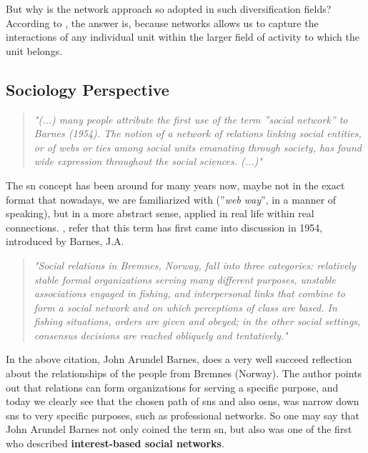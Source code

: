 \indent But why is the network approach so adopted in such diversification fields? According to \cite{kilduff2003social}, the answer is, because networks allows us to capture the interactions of any individual unit within the larger field of activity to which the unit belongs.


\subsection{Sociology Perspective}
\begin{quote}
\textit{"(...) many people attribute the first use of the term ''social network'' to
Barnes (1954). The notion of a network of relations linking social entities, or of webs or ties among social units emanating through society, has
found wide expression throughout the social sciences. (...)"}
\cite{wasserman1994social}
\end{quote}

The \gls{sn} concept has been around for many years now, maybe not in the exact format that nowadays, we are familiarized with (''\textit{web way}'', in a manner of speaking), but in a more abstract sense, applied in real life within real connections.
\cite{wasserman1994social}, refer that this term has first came into discussion in 1954, introduced by Barnes, J.A.

\begin{quote}
\textit{"Social relations in Bremnes, Norway, fall into three categories: relatively stable formal organizations serving many different
purposes, unstable associations engaged in fishing, and interpersonal links that combine to form a social
network and on which perceptions of class are based. In fishing situations, orders are given and
obeyed; in the other social settings, consensus decisions are reached obliquely and tentatively."}
\cite{barnes1954class}
\end{quote}

In the above citation, John Arundel Barnes, does a very well succeed reflection about the relationships of the people from Bremnes (Norway). The author points out that relations can form organizations for serving a specific purpose, and today we clearly see that the chosen path of \glspl{sn} and also \glspl{osn}, was narrow down \glspl{sn} to very specific purposes, such as professional networks. So one may say that John Arundel Barnes not only coined the term \gls{sn}, but also was one of the first who described \textbf{interest-based social networks}.

